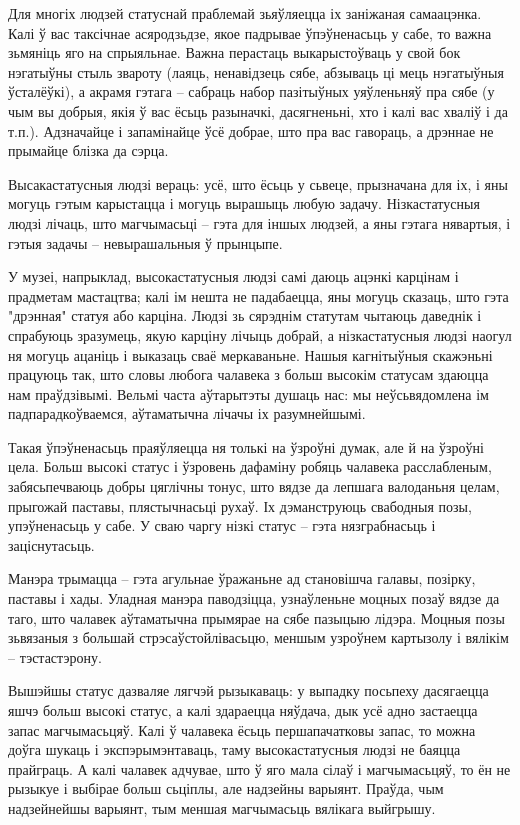 Для многіх людзей статуснай праблемай зьяўляецца іх заніжаная самаацэнка. Калі ў вас таксічнае асяродзьдзе, якое падрывае ўпэўненасьць у сабе, то важна зьмяніць яго на спрыяльнае. Важна перастаць выкарыстоўваць у свой бок нэгатыўны стыль звароту (лаяць, ненавідзець сябе, абзываць ці мець нэгатыўныя ўсталёўкі), а акрамя гэтага – сабраць набор пазітыўных уяўленьняў пра сябе (у чым вы добрыя, якія ў вас ёсьць разыначкі, дасягненьні, хто і калі вас хваліў і да т.п.). Адзначайце і запамінайце ўсё добрае, што пра вас гавораць, а дрэннае не прымайце блізка да сэрца.

Высакастатусныя людзі вераць: усё, што ёсьць у сьвеце, прызначана для іх, і яны могуць гэтым карыстацца і могуць вырашыць любую задачу. Нізкастатусныя людзі лічаць, што магчымасьці – гэта для іншых людзей, а яны гэтага нявартыя, і гэтыя задачы – невырашальныя ў прынцыпе.

У музеі, напрыклад, высокастатусныя людзі самі даюць ацэнкі карцінам і прадметам мастацтва; калі ім нешта не падабаецца, яны могуць сказаць, што гэта "дрэнная" статуя або карціна. Людзі зь сярэднім статутам чытаюць даведнік і спрабуюць зразумець, якую карціну лічыць добрай, а нізкастатусныя людзі наогул ня могуць ацаніць і выказаць сваё меркаваньне. Нашыя кагнітыўныя скажэньні працуюць так, што словы любога чалавека з больш высокім статусам здаюцца нам праўдзівымі. Вельмі часта аўтарытэты душаць нас: мы неўсьвядомлена ім падпарадкоўваемся, аўтаматычна лічачы іх разумнейшымі.

Такая ўпэўненасьць праяўляецца ня толькі на ўзроўні думак, але й на ўзроўні цела. Больш высокі статус і ўзровень дафаміну робяць чалавека расслабленым, забясьпечваюць добры цяглічны тонус, што вядзе да лепшага валоданьня целам, прыгожай паставы, плястычнасьці рухаў. Іх дэманструюць свабодныя позы, упэўненасьць у сабе. У сваю чаргу нізкі статус – гэта нязграбнасьць і заціснутасьць.

Манэра трымацца – гэта агульнае ўражаньне ад становішча галавы, позірку, паставы і хады. Уладная манэра паводзіцца, узнаўленьне моцных позаў вядзе да таго, што чалавек аўтаматычна прымярае на сябе пазыцыю лідэра. Моцныя позы зьвязаныя з большай стрэсаўстойлівасьцю, меншым узроўнем картызолу і вялікім – тэстастэрону.

Вышэйшы статус дазваляе лягчэй рызыкаваць: у выпадку посьпеху дасягаецца яшчэ больш высокі статус, а калі здараецца няўдача, дык усё адно застаецца запас магчымасьцяў. Калі ў чалавека ёсьць першапачатковы запас, то можна доўга шукаць і экспэрымэнтаваць, таму высокастатусныя людзі не баяцца прайграць. А калі чалавек адчувае, што ў яго мала сілаў і магчымасьцяў, то ён не рызыкуе і выбірае больш сьціплы, але надзейны варыянт. Праўда, чым надзейнейшы варыянт, тым меншая магчымасьць вялікага выйгрышу.

